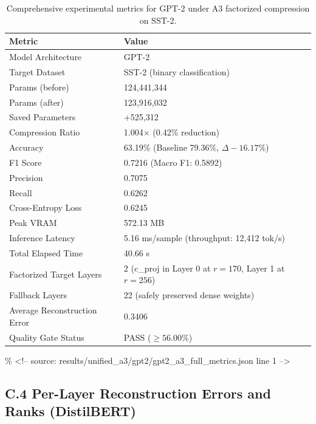 \begin{table}[H]
\centering
\small
\begin{tabular}{ll}
\toprule
\textbf{Metric} & \textbf{Value} \\
\midrule
Model Architecture & GPT-2 \\
Target Dataset & SST-2 (binary classification) \\
Params (before) & 124,441,344 \\
Params (after) & 123,916,032 \\
Saved Parameters & +525,312 \\
Compression Ratio & 1.004$\times$ (0.42\% reduction) \\
Accuracy & 63.19\% (Baseline 79.36\%, $\Delta -16.17\%$) \\
F1 Score & 0.7216 (Macro F1: 0.5892) \\
Precision & 0.7075 \\
Recall & 0.6262 \\
Cross-Entropy Loss & 0.6245 \\
Peak VRAM & 572.13 MB \\
Inference Latency & 5.16 ms/sample (throughput: 12,412 tok/s) \\
Total Elapsed Time & 40.66 s \\
Factorized Target Layers & 2 (c\_proj in Layer 0 at $r=170$, Layer 1 at $r=256$) \\
Fallback Layers & 22 (safely preserved dense weights) \\
Average Reconstruction Error & 0.3406 \\
Quality Gate Status & PASS ($\ge 56.00\%$) \\
\bottomrule
\end{tabular}
\caption{Comprehensive experimental metrics for GPT-2 under A3 factorized compression on SST-2.}
\label{tab:gpt2_full_metrics}
\end{table}
\% \textless{}!-- source: results/unified\_a3/gpt2/gpt2\_a3\_full\_metrics.json line 1 --\textgreater{}

\subsection{C.4 Per-Layer Reconstruction Errors and Ranks (DistilBERT)}

